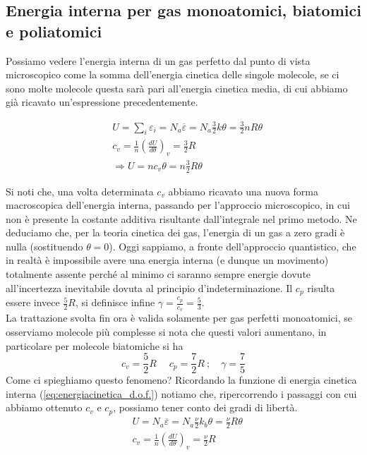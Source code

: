 \documentclass[
10pt, %
a4paper, %
oneside, %
headinclude,footinclude, %
BCOR5mm, %
]{scrartcl}
\begin{document}
\subsection{Energia interna per gas monoatomici, biatomici e poliatomici}\label{sec:energia_interna_mono_bi_poli}
Possiamo vedere l'energia interna di un gas perfetto dal punto di vista microscopico come la somma dell'energia cinetica delle singole molecole, se ci sono molte molecole questa sarà pari all'energia cinetica media, di cui abbiamo già ricavato un'espressione precedentemente. 

\begin{align*} 
	&U = \sum_i \varepsilon_i= N_a \overline{\varepsilon} = N_a \frac{3}{2} k \theta = \frac{3}{2}n R \theta\\
	&c_v = \frac{1}{n}\left(\frac{dU}{d\theta}\right)_v=\frac{3}{2}R\\
	&\Rightarrow U = n c_v\theta = n\frac{3}{2}R \theta 
\end{align*} 

Si noti che, una volta determinata \(c_v\) abbiamo ricavato una nuova forma macroscopica dell'energia interna, passando per l'approccio microscopico, in cui non è presente la costante additiva risultante dall'integrale nel primo metodo. Ne deduciamo che, per la teoria cinetica dei gas, l'energia di un gas a zero gradi è nulla (sostituendo $\theta=0$). Oggi sappiamo, a fronte dell'approccio quantistico, che in realtà è impossibile avere una energia interna (e dunque un movimento) totalmente assente perché al minimo ci saranno sempre energie dovute all'incertezza inevitabile dovuta al principio d'indeterminazione. Il $c_p$ risulta essere invece \(\frac{5}{2}R\), si definisce infine $\gamma=\frac{c_p}{c_v}=\frac{5}{3}$.\\
La trattazione svolta fin ora è valida solamente per gas perfetti monoatomici, se osserviamo molecole più complesse si nota che questi valori aumentano, in particolare per molecole biatomiche si ha
\[c_v=\frac{5}{2}R\;\quad c_p=\frac{7}{2}R\ ; \quad \gamma = \frac{7}{5}\]
Come ci spieghiamo questo fenomeno? Ricordando la funzione di energia cinetica interna (\ref{eq:energiacinetica_d.o.f.}) notiamo che, ripercorrendo i passaggi con cui abbiamo ottenuto $c_v$ e $c_p$, possiamo tener conto dei gradi di libertà.
\begin{align*} 
	&U = N_a \overline{\varepsilon} = N_a \frac{\nu}{2} k_b \theta = \frac{\nu}{2} R \theta\\
	&c_v = \frac{1}{n}\left(\frac{dU}{d\theta}\right)_v=\frac{\nu}{2}R
\end{align*} 
\end{document}
